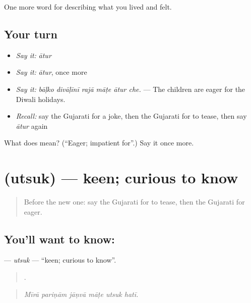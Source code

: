 \begin{grammarlens}[title={What you've built}]
One more word for describing what you lived and felt.
\end{grammarlens}

\subsection*{Your turn}
\begin{itemize}
\raggedright
  \item \emph{Say it:} \emph{ātur}
  \item \emph{Say it:} \emph{ātur}, once more
  \item \emph{Say it:} \emph{bāḷko divāḷīnī rajā māṭe ātur che.} — The children are eager for the Diwali holidays.
  \item \emph{Recall:} say the Gujarati for a joke, then the Gujarati for to tease, then say \emph{ātur} again
\end{itemize}

\begin{tcolorbox}[breakable,colback=teal!4,colframe=teal!35!black,title={Before you move on}]
What does  mean? (\textquotedblleft{}Eager; impatient for\textquotedblright{}.) Say it once more.
\end{tcolorbox}
\section[\texorpdfstring{\gu{ઉત્સુક} (utsuk)}{ઉત્સુક (utsuk)}]{ (utsuk) — keen; curious to know}

\label{lesson:GU-C449-utsuk}



\begin{quote}
Before the new one: say the Gujarati for to tease, then the Gujarati for eager.
\end{quote}

\subsection*{You'll want to know: }
\textbf{} — \emph{utsuk} — \textquotedblleft{}keen; curious to know\textquotedblright{}.

\begin{quote}
     .
\end{quote}

\begin{quote}
\emph{Mīrā pariṇām jāṇvā māṭe utsuk hatī.}
\end{quote}

